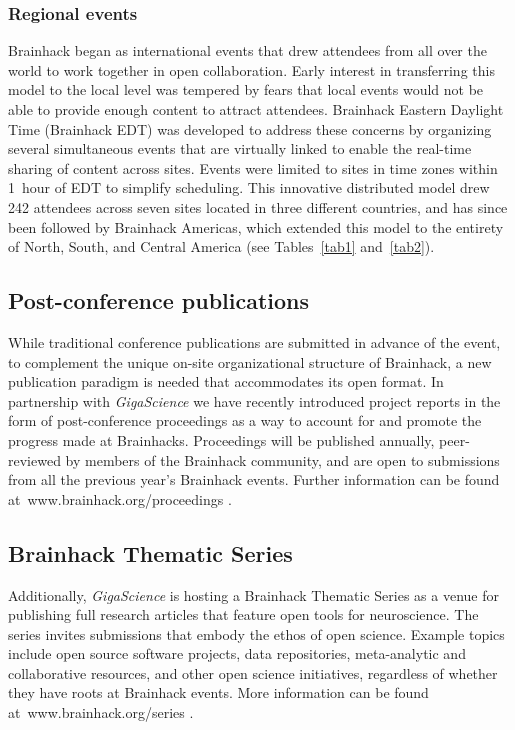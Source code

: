 \documentclass[11pt]{bmc_article_s50}
\begin{document}
\subsubsection*{Regional events}

Brainhack began as international events that drew attendees from all over the world to work together in open collaboration. Early interest in transferring this model to the local level was tempered by fears that local events would not be able to provide enough content to attract attendees. Brainhack Eastern Daylight Time (Brainhack EDT) was developed to address these concerns by organizing several simultaneous events that are virtually linked to enable the real-time sharing of content across sites. Events were limited to sites in time zones within 1~hour of EDT to simplify scheduling. This innovative distributed model drew 242 attendees across seven sites located in three different countries, and has since been followed by Brainhack Americas, which extended this model to the entirety of North, South, and Central America (see Tables~\ref{tab1} and~\ref{tab2}).

\subsection*{Post-conference publications}

While traditional conference publications are submitted in advance of the event, to complement the unique on-site organizational structure of Brainhack, a new publication paradigm is needed that accommodates its open format. In partnership with \emph{GigaScience} \cite{gigascience} we have recently introduced project reports in the form of {post-conference proceedings} as a way to account for and promote the progress made at Brainhacks. Proceedings will be published annually, peer-reviewed by members of the Brainhack community, and are open to submissions from all the previous year's Brainhack events. Further information can be found at~www.brainhack.org/proceedings \cite{brainhack_proceedings}. 

\subsection*{Brainhack Thematic Series}

Additionally, \emph{GigaScience} \cite{gigascience} is hosting a {Brainhack Thematic Series} as a venue for publishing full research articles that feature open tools for neuroscience. The series invites submissions that embody the ethos of open science. Example topics include open source software projects, data repositories, meta-analytic and collaborative resources, and other open science initiatives, regardless of whether they have roots at Brainhack events. More information can be found at~www.brainhack.org/series \cite{brainhack_series}.
\end{document}
